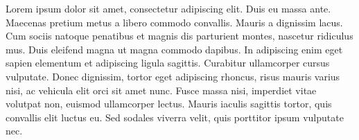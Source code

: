 Lorem ipsum dolor sit amet, consectetur adipiscing elit. Duis eu massa ante. Maecenas pretium metus a libero commodo convallis. Mauris a dignissim lacus. Cum sociis natoque penatibus et magnis dis parturient montes, nascetur ridiculus mus. Duis eleifend magna ut magna commodo dapibus. In adipiscing enim eget sapien elementum et adipiscing ligula sagittis. Curabitur ullamcorper cursus vulputate. Donec dignissim, tortor eget adipiscing rhoncus, risus mauris varius nisi, ac vehicula elit orci sit amet nunc. Fusce massa nisi, imperdiet vitae volutpat non, euismod ullamcorper lectus. Mauris iaculis sagittis tortor, quis convallis elit luctus eu. Sed sodales viverra velit, quis porttitor ipsum vulputate nec.


